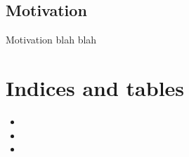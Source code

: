 \documentclass[letterpaper,10pt,english,openany,oneside]{sphinxmanual}
\begin{document}
\section{Motivation}
\label{\detokenize{index:motivation}}
Motivation blah blah


\chapter{Indices and tables}
\label{\detokenize{index:indices-and-tables}}\begin{itemize}
\item {} 

\item {} 

\item {} 

\end{itemize}


\renewcommand{\indexname}{Python Module Index}
\begin{sphinxtheindex}
\let\bigletter\sphinxstyleindexlettergroup
\bigletter{n}
\item\relax{}
\item\relax{}
\item\relax{}
\end{sphinxtheindex}

\renewcommand{\indexname}{Index}
\printindex
\end{document}
